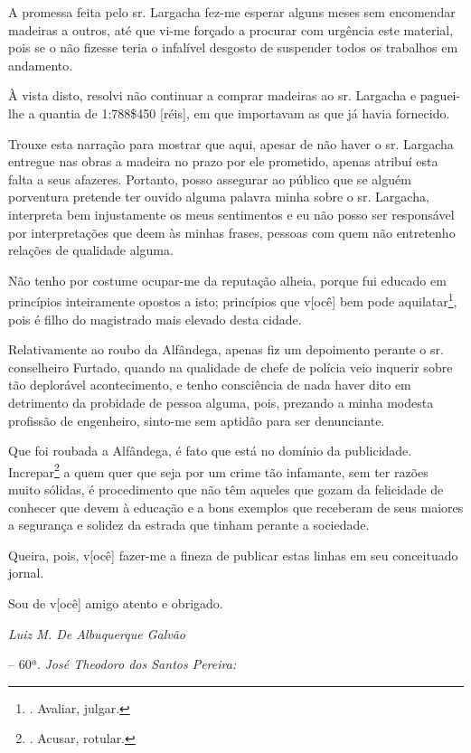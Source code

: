 A promessa feita pelo sr. Largacha fez-me esperar alguns meses sem
encomendar madeiras a outros, até que vi-me forçado a procurar com
urgência este material, pois se o não fizesse teria o infalível desgosto
de suspender todos os trabalhos em andamento.

À vista disto, resolvi não continuar a comprar madeiras ao sr. Largacha
e paguei-lhe a quantia de 1:788\$450 {[}réis{]}, em que importavam as
que já havia fornecido.

Trouxe esta narração para mostrar que aqui, apesar de não haver o sr.
Largacha entregue nas obras a madeira no prazo por ele prometido, apenas
atribuí esta falta a seus afazeres. Portanto, posso assegurar ao público
que se alguém porventura pretende ter ouvido alguma palavra minha sobre
o sr. Largacha, interpreta bem injustamente os meus sentimentos e eu não
posso ser responsável por interpretações que deem às minhas frases,
pessoas com quem não entretenho relações de qualidade alguma.

Não tenho por costume ocupar-me da reputação alheia, porque fui educado
em princípios inteiramente opostos a isto; princípios que v{[}ocê{]} bem
pode aquilatar\footnote{. Avaliar, julgar.}, pois é filho do magistrado
mais elevado desta cidade.

Relativamente ao roubo da Alfândega, apenas fiz um depoimento perante o
sr. conselheiro Furtado, quando na qualidade de chefe de polícia veio
inquerir sobre tão deplorável acontecimento, e tenho consciência de nada
haver dito em detrimento da probidade de pessoa alguma, pois, prezando a
minha modesta profissão de engenheiro, sinto-me sem aptidão para ser
denunciante.

Que foi roubada a Alfândega, é fato que está no domínio da publicidade.
Increpar\footnote{. Acusar, rotular.} a quem quer que seja por um crime
tão infamante, sem ter razões muito sólidas, é procedimento que não têm
aqueles que gozam da felicidade de conhecer que devem à educação e a
bons exemplos que receberam de seus maiores a segurança e solidez da
estrada que tinham perante a sociedade.

Queira, pois, v{[}ocê{]} fazer-me a fineza de publicar estas linhas em
seu conceituado jornal.

Sou de v{[}ocê{]} amigo atento e obrigado.

\emph{Luiz M. De Albuquerque Galvão}

-- 60ª. \emph{José Theodoro dos Santos Pereira:}

